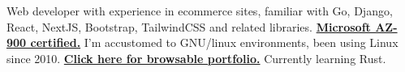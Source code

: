 


\begin{cvpubs}

  \cvpub
    {
      \begin{cvlist}
  \item { Web developer with experience in ecommerce sites, familiar with Go, Django, React, NextJS, Bootstrap, TailwindCSS and related libraries. \textbf{\href{https://www.credly.com/badges/17608a52-2cb7-4268-a907-613459559911/public_url}{Microsoft AZ-900 certified.}} I'm accustomed to GNU/linux environments, been using Linux since 2010. \textbf{\href{https://eduardozepeda.dev/\#portfolio}{Click here for browsable portfolio.}}} Currently learning Rust. 
      \end{cvlist}
    }\vspace{-15pt}
\end{cvpubs}
